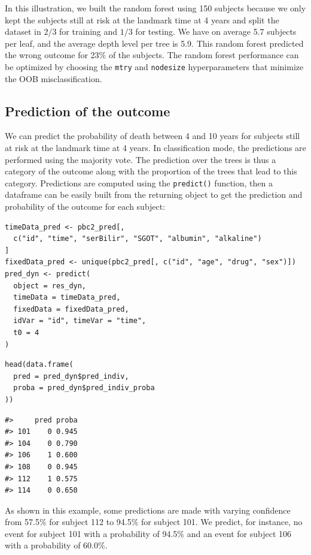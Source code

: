 In this illustration, we built the random forest using 150 subjects because we only kept the subjects still at risk at the landmark time at 4 years and split the dataset in \(2/3\) for training and \(1/3\) for testing. We have on average 5.7 subjects per leaf, and the average depth level per tree is 5.9. This random forest predicted the wrong outcome for 23\% of the subjects. The random forest performance can be optimized by choosing the \texttt{mtry} and \texttt{nodesize} hyperparameters that minimize the OOB misclassification.

\subsection{Prediction of the outcome}\label{prediction-of-the-outcome}

We can predict the probability of death between 4 and 10 years for subjects still at risk at the landmark time at 4 years. In classification mode, the predictions are performed using the majority vote. The prediction over the trees is thus a category of the outcome along with the proportion of the trees that lead to this category. Predictions are computed using the \texttt{predict()} function, then a dataframe can be easily built from the returning object to get the prediction and probability of the outcome for each subject:

\begin{verbatim}
timeData_pred <- pbc2_pred[,
  c("id", "time", "serBilir", "SGOT", "albumin", "alkaline")
]
fixedData_pred <- unique(pbc2_pred[, c("id", "age", "drug", "sex")])
pred_dyn <- predict(
  object = res_dyn,
  timeData = timeData_pred,
  fixedData = fixedData_pred,
  idVar = "id", timeVar = "time",
  t0 = 4
)
\end{verbatim}

\begin{verbatim}
head(data.frame(
  pred = pred_dyn$pred_indiv,
  proba = pred_dyn$pred_indiv_proba
))
\end{verbatim}

\begin{verbatim}
#>     pred proba
#> 101    0 0.945
#> 104    0 0.790
#> 106    1 0.600
#> 108    0 0.945
#> 112    1 0.575
#> 114    0 0.650
\end{verbatim}

As shown in this example, some predictions are made with varying confidence from 57.5\% for subject 112 to 94.5\% for subject 101. We predict, for instance, no event for subject 101 with a probability of 94.5\% and an event for subject 106 with a probability of 60.0\%.

